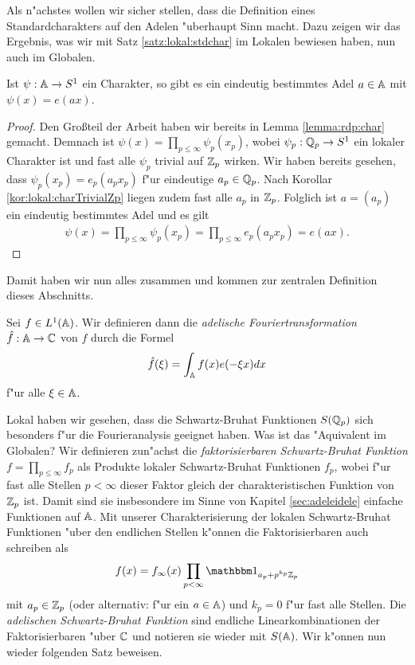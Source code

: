 	
	Als n"achstes wollen wir sicher stellen, dass die Definition eines Standardcharakters auf den Adelen "uberhaupt Sinn macht.
	Dazu zeigen wir das Ergebnis, was wir mit Satz \ref{satz:lokal:stdchar} im Lokalen bewiesen haben, nun auch im Globalen.
	\begin{satz}
		Ist $\psi: \mathbb{A} \to S^1$ ein Charakter, so gibt es ein eindeutig bestimmtes Adel $a\in\mathbb{A}$ mit $\psi(x) = e(ax)$.
	\end{satz}
	\begin{proof}
		Den Großteil der Arbeit haben wir bereits in Lemma \ref{lemma:rdp:char} gemacht. Demnach ist $\psi(x) = \prod_{p\leq\infty} \psi_p (x_p)$, wobei $\psi_p: {\mathbb{Q}_p} \to S^1$ ein lokaler Charakter ist und fast alle $\psi_p$ trivial auf ${\mathbb{Z}_p}$ wirken.
		Wir haben bereits gesehen, dass $\psi_p (x_p) = e_p(a_p x_p)$ f"ur eindeutige $a_p \in {\mathbb{Q}_p}$.
		Nach Korollar \ref{kor:lokal:charTrivialZp} liegen zudem fast alle $a_p$ in ${\mathbb{Z}_p}$.
		Folglich ist $a = (a_p)$ ein eindeutig bestimmtes Adel und es gilt
		\begin{align*}
			\psi(x) = \prod_{p\leq\infty} \psi_p (x_p) = \prod_{p\leq\infty} e_p (a_px_p) = e(ax).
		\end{align*}
	\end{proof}
	Damit haben wir nun alles zusammen und kommen zur zentralen Definition dieses Abschnitts.
	
	\begin{defi}
		Sei $f\in L^1(\mathbb{A})$. Wir definieren dann die \emph{adelische Fouriertransformation} $\hat{f}: \mathbb{A} \to \mathbb{C}$ von $f$ durch die Formel
	\begin{align*}
		\hat{f}(\xi) = \int_{\mathbb{A}} f(x)e(-\xi x)  d{x}
	\end{align*}
	f"ur alle $\xi \in \mathbb{A}$.
	\end{defi}
	
	Lokal haben wir gesehen, dass die Schwartz-Bruhat Funktionen $S({\mathbb{Q}_p})$ sich besonders f"ur die Fourieranalysis geeignet haben. 
	Was ist das "Aquivalent im Globalen?
	Wir definieren zun"achst die \emph{faktorisierbaren Schwartz-Bruhat Funktion} $f=\prod_{p\leq \infty} f_p$ als Produkte lokaler Schwartz-Bruhat Funktionen $f_p$, wobei f"ur fast alle Stellen $p<\infty$ dieser Faktor gleich der charakteristischen Funktion von ${\mathbb{Z}_p}$ ist.
	Damit sind sie insbesondere im Sinne von Kapitel \ref{sec:adeleidele} einfache Funktionen auf $\mathbb{A}$.
	Mit unserer Charakterisierung der lokalen Schwartz-Bruhat Funktionen "uber den endlichen Stellen k"onnen die Faktorisierbaren auch schreiben als
	\begin{align}
		f(x) = f_\infty(x) \prod_{p<\infty} \ind_{a_p+p^{k_p}\Zp}
	\end{align}
	mit $a_p \in {\mathbb{Z}_p}$ (oder alternativ: f"ur ein $a \in \mathbb{A}$) und $k_p =0$ f"ur fast alle Stellen.
	Die \emph{adelischen Schwartz-Bruhat Funktion} sind endliche Linearkombinationen der Faktorisierbaren "uber $\mathbb{C}$ und notieren sie wieder mit $S(\mathbb{A})$.
	Wir k"onnen nun wieder folgenden Satz beweisen.
	

